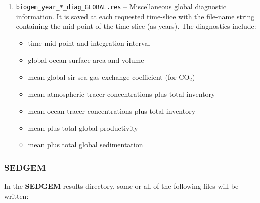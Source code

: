 \documentclass[11pt,fleqn]{book} %
\begin{document}
\begin{enumerate}
\vspace{1mm}\item \texttt{biogem\_year\_*\_diag\_GLOBAL.res} -- Miscellaneous global diagnostic information. It is saved at each requested time-slice with the file-name string containing the mid-point of the time-slice (as years). The diagnostics include:
        \begin{itemize}
                \item time mid-point and integration interval
                \item global ocean surface area and volume
                \item mean global sir-sea gas exchange coefficient (for CO\begin{math}_2\end{math})
                \item mean atmospheric tracer concentrations plus total inventory
                \item mean ocean tracer concentrations plus total inventory
                \item mean plus total global productivity
                \item mean plus total global sedimentation
        \end{itemize}

\end{enumerate}\vspace{2mm}

\subsubsection{SEDGEM}

\noindent In the \textbf{SEDGEM} results directory, some or all of the following files will be written:
\end{document}
